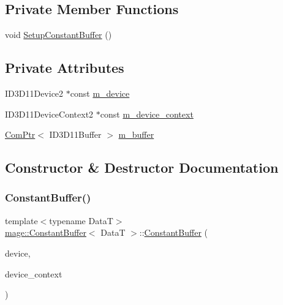 \subsection*{Private Member Functions}
\begin{DoxyCompactItemize}
\item 
void \hyperlink{structmage_1_1_constant_buffer_ab44b95795f110d3097a24edd71aa790e}{Setup\+Constant\+Buffer} ()
\end{DoxyCompactItemize}
\subsection*{Private Attributes}
\begin{DoxyCompactItemize}
\item 
I\+D3\+D11\+Device2 $\ast$const \hyperlink{structmage_1_1_constant_buffer_a52d9b6722b8f7e20d079d5575169995f}{m\+\_\+device}
\item 
I\+D3\+D11\+Device\+Context2 $\ast$const \hyperlink{structmage_1_1_constant_buffer_a4b41661b3c7e0a5880f422cd93e822aa}{m\+\_\+device\+\_\+context}
\item 
\hyperlink{namespacemage_ae74f374780900893caa5555d1031fd79}{Com\+Ptr}$<$ I\+D3\+D11\+Buffer $>$ \hyperlink{structmage_1_1_constant_buffer_a394571e3102fe053f3357e2e218c0eda}{m\+\_\+buffer}
\end{DoxyCompactItemize}


\subsection{Constructor \& Destructor Documentation}
\hypertarget{structmage_1_1_constant_buffer_a19be787da1f12521a901821e93cd6d70}{}\label{structmage_1_1_constant_buffer_a19be787da1f12521a901821e93cd6d70} 
\subsubsection{\texorpdfstring{Constant\+Buffer()}{ConstantBuffer()}\hspace{0.1cm}{\footnotesize\ttfamily [1/3]}}
{\footnotesize\ttfamily template$<$typename DataT$>$ \\
\hyperlink{structmage_1_1_constant_buffer}{mage\+::\+Constant\+Buffer}$<$ DataT $>$\+::\hyperlink{structmage_1_1_constant_buffer}{Constant\+Buffer} (\begin{DoxyParamCaption}\item[{I\+D3\+D11\+Device2 $\ast$}]{device,  }\item[{I\+D3\+D11\+Device\+Context2 $\ast$}]{device\+\_\+context }\end{DoxyParamCaption})\hspace{0.3cm}{\ttfamily [explicit]}}

